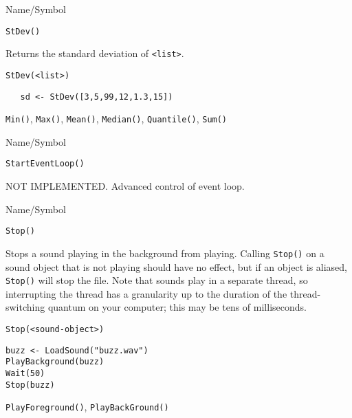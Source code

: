 \rl


\begin{desc}{Name/Symbol}
\item[Name/Symbol]  	\verb+StDev()+ 

\item[Description]  Returns the standard deviation of \verb+<list>+.

\item[Usage]       	
\begin{verbatim}
StDev(<list>)        
\end{verbatim}

\item[Example]	
\begin{verbatim}
   sd <- StDev([3,5,99,12,1.3,15])        
\end{verbatim}

\item[See Also]     	\verb+Min()+, \verb+Max()+, \verb+Mean()+, \verb+Median()+, \verb+Quantile()+, \verb+Sum()+
\end{desc}

\rl


\begin{desc}{Name/Symbol}
\item[Name/Symbol]  	\verb+StartEventLoop()+

\item[Description]  	NOT IMPLEMENTED. Advanced control of event loop.

\item[Usage]		

\item[Example]	

\item[See Also]	
\end{desc}

\rl


\begin{desc}{Name/Symbol}
\item[Name/Symbol]  	\verb+Stop()+	

\item[Description] Stops a sound playing in the background from
  playing.  Calling \verb+Stop()+ on a sound object that is not
  playing should have no effect, but if an object is aliased,
  \verb+Stop()+ will stop the file.  Note that sounds play in a
  separate thread, so interrupting the thread has a granularity up to
  the duration of the thread-switching quantum on your computer; this
  may be tens of milliseconds.

\item[Usage]
\begin{verbatim}
Stop(<sound-object>)
\end{verbatim}

\item[Example]     	
\begin{verbatim}
buzz <- LoadSound("buzz.wav")
PlayBackground(buzz)
Wait(50)
Stop(buzz)
\end{verbatim}

\item[See Also]    	\verb+PlayForeground()+, \verb+PlayBackGround()+
\end{desc}

